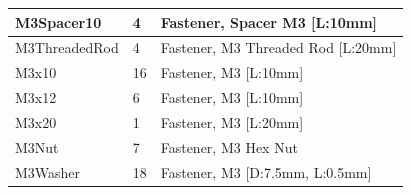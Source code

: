 \begin{table}[h!]
{\begin{tabular}{ | l | l | l |}
    	M3Spacer10 & 4 & Fastener, Spacer M3 [L:10mm] \\ \hline
	M3ThreadedRod & 4 & Fastener, M3 Threaded Rod [L:20mm]  \\ \hline	
    	M3x10 & 16 & Fastener, M3 [L:10mm] \\ \hline
    	M3x12 & 6 & Fastener, M3 [L:10mm] \\ \hline
    	M3x20 & 1 & Fastener, M3 [L:20mm] \\ \hline
    	M3Nut &  7 & Fastener, M3 Hex Nut \\ \hline
    	M3Washer &  18 & Fastener, M3 [D:7.5mm, L:0.5mm] \\ \hline
    	\end{tabular}
}
\end{table}

\vspace{0.2cm}

